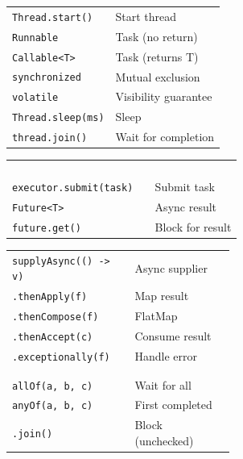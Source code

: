 \documentclass[10pt]{extarticle}
\begin{document}
\begin{multicols}{2}

\begin{tabularx}{\linewidth}{@{}l@{\enspace}Y@{}}
\texttt{Thread.start()}                & Start thread \\
\texttt{Runnable}                      & Task (no return) \\
\texttt{Callable<T>}                  & Task (returns T) \\
\texttt{synchronized}                  & Mutual exclusion \\
\texttt{volatile}                      & Visibility guarantee \\
\texttt{Thread.sleep(ms)}              & Sleep \\
\texttt{thread.join()}                 & Wait for completion \\
\end{tabularx}

\begin{tabularx}{\linewidth}{@{}>{\raggedright\arraybackslash}p{0.62\linewidth}@{\enspace}Y@{}}
 & \\
 \\
 & \\
 \\
\texttt{executor.submit(task)}          & Submit task \\
\texttt{Future<T>}                     & Async result \\
\texttt{future.get()}                   & Block for result \\
\end{tabularx}

\begin{tabularx}{\linewidth}{@{}>{\raggedright\arraybackslash}p{0.55\linewidth}@{\enspace}Y@{}}
\texttt{supplyAsync(() -> v)}          & Async supplier \\
\texttt{.thenApply(f)}                  & Map result \\
\texttt{.thenCompose(f)}                & FlatMap \\
\texttt{.thenAccept(c)}                 & Consume result \\
\texttt{.exceptionally(f)}              & Handle error \\
 & \\
 \\
\texttt{allOf(a, b, c)}                 & Wait for all \\
\texttt{anyOf(a, b, c)}                 & First completed \\
\texttt{.join()}                         & Block (unchecked) \\
\end{tabularx}


\end{multicols}
\end{document}
